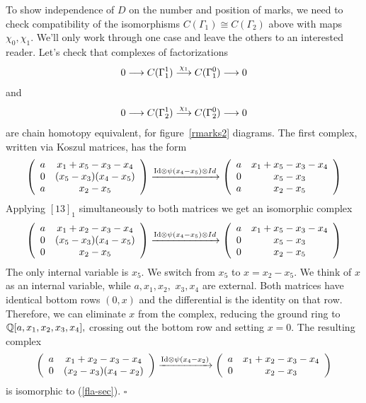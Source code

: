 \documentclass[12pt]{article}
\begin{document}
To show independence of $D$ on the number and position of marks, we 
need to check compatibility of the isomorphisms $C(\Gamma_1)\cong C(\Gamma_2)$ 
above with maps $\chi_0, \chi_1.$ We'll only work through one case and 
leave the others to an interested reader. Let's check that complexes 
of factorizations 
$$0 \longrightarrow C(\Gamma^1_1) \stackrel{\chi_1}{\longrightarrow}  C(\Gamma^0_1)\longrightarrow 0 $$ 
and 
\begin{equation} 
0 \longrightarrow   C(\Gamma^1_2) \stackrel{\chi_1}{\longrightarrow}C(\Gamma^0_2)\longrightarrow 0
\label{fla-sec} 
\end{equation}  
are chain homotopy equivalent, for figure~\ref{rmarks2} diagrams. 
The first complex, written via Koszul matrices, has the form 
$$ \left( \begin{array}{cc} a & x_1 +x_5 -x_3 -x_4 \\
   0 & (x_5 - x_3)(x_4-x_5) \\ a & x_2 -x_5 \end{array}\right) 
 \xrightarrow{\mathrm{Id} \otimes \psi(x_4-x_5) \otimes Id} 
   \left( \begin{array}{cc} a & x_1 +x_5 -x_3 -x_4 \\
   0 & x_5-x_3 \\ a & x_2 -x_5 \end{array}\right) $$
Applying $[13]_1$ simultaneously to both matrices we get an 
isomorphic complex 
$$\left( \begin{array}{cc} a & x_1 +x_2 -x_3 -x_4 \\
   0 & (x_5 - x_3)(x_4-x_5) \\ 0 & x_2 -x_5 \end{array}\right) 
 \xrightarrow{\mathrm{Id} \otimes \psi(x_4-x_5) \otimes Id} 
   \left( \begin{array}{cc} a & x_1 +x_5 -x_3 -x_4 \\
   0 & x_5-x_3 \\ 0 & x_2 -x_5 \end{array}\right) $$
The only internal variable is $x_5.$ We switch from $x_5$ to 
$x=x_2-x_5.$ We think of $x$ as an internal variable, 
while $a, x_1, x_2,$ $x_3, x_4$ are external. Both matrices 
have identical bottom rows $(0,x)$ and the differential 
is the identity on that row. Therefore, we can eliminate $x$ from 
the complex, reducing the ground ring to $\mathbb Q[a,x_1, x_2, x_3, x_4],$ 
crossing out the bottom row and setting $x=0.$ The resulting 
complex  
$$\left( \begin{array}{cc} a & x_1 +x_2 -x_3 -x_4 \\
   0 & (x_2 - x_3)(x_4-x_2) \end{array}\right) 
 \xrightarrow{\mathrm{Id} \otimes \psi(x_4-x_2) } 
   \left( \begin{array}{cc} a & x_1 +x_2 -x_3 -x_4 \\
   0 & x_2-x_3 \end{array}\right) $$
is isomorphic to (\ref{fla-sec}). $\square$ 
\end{document}

